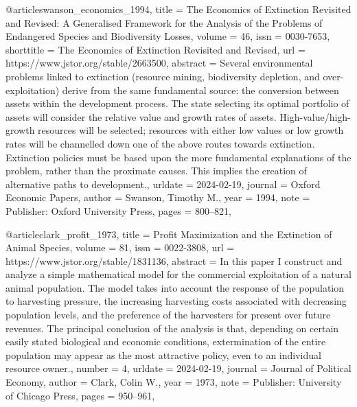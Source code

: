 {{{{@article{swanson_economics_1994,
	title = {The {Economics} of {Extinction} {Revisited} and {Revised}: {A} {Generalised} {Framework} for the {Analysis} of the {Problems} of {Endangered} {Species} and {Biodiversity} {Losses}},
	volume = {46},
	issn = {0030-7653},
	shorttitle = {The {Economics} of {Extinction} {Revisited} and {Revised}},
	url = {https://www.jstor.org/stable/2663500},
	abstract = {Several environmental problems linked to extinction (resource mining, biodiversity depletion, and over-exploitation) derive from the same fundamental source: the conversion between assets within the development process. The state selecting its optimal portfolio of assets will consider the relative value and growth rates of assets. High-value/high-growth resources will be selected; resources with either low values or low growth rates will be channelled down one of the above routes towards extinction. Extinction policies must be based upon the more fundamental explanations of the problem, rather than the proximate causes. This implies the creation of alternative paths to development.},
	urldate = {2024-02-19},
	journal = {Oxford Economic Papers},
	author = {Swanson, Timothy M.},
	year = {1994},
	note = {Publisher: Oxford University Press},
	pages = {800--821},
}

@article{clark_profit_1973,
	title = {Profit {Maximization} and the {Extinction} of {Animal} {Species}},
	volume = {81},
	issn = {0022-3808},
	url = {https://www.jstor.org/stable/1831136},
	abstract = {In this paper I construct and analyze a simple mathematical model for the commercial exploitation of a natural animal population. The model takes into account the response of the population to harvesting pressure, the increasing harvesting costs associated with decreasing population levels, and the preference of the harvesters for present over future revenues. The principal conclusion of the analysis is that, depending on certain easily stated biological and economic conditions, extermination of the entire population may appear as the most attractive policy, even to an individual resource owner.},
	number = {4},
	urldate = {2024-02-19},
	journal = {Journal of Political Economy},
	author = {Clark, Colin W.},
	year = {1973},
	note = {Publisher: University of Chicago Press},
	pages = {950--961},
}

}}}}
